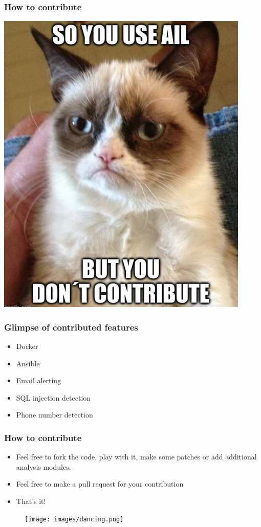 \documentclass[aspectratio=169]{beamer}
\begin{document}
\begin{frame}
\frametitle{How to contribute}
    \centerline{\includegraphics[scale=0.33]{images/cat.png}}
\end{frame}

\begin{frame}
    \frametitle{Glimpse of contributed features}
    \begin{itemize}
        \item Docker
        \item Ansible
        \item Email alerting
        \item SQL injection detection
        \item Phone number detection
    \end{itemize}
\end{frame}


\begin{frame}
\frametitle{How to contribute}
    \begin{itemize}
        \item Feel free to fork the code, play with it, make some patches or add additional analysis modules.
        \pause
        \item Feel free to make a pull request for your contribution
        \pause
        \item That's it!
    \end{itemize}
    \begin{figure}
        \texttt{[image: images/dancing.png]}
    \end{figure}
\end{frame}
\end{document}
